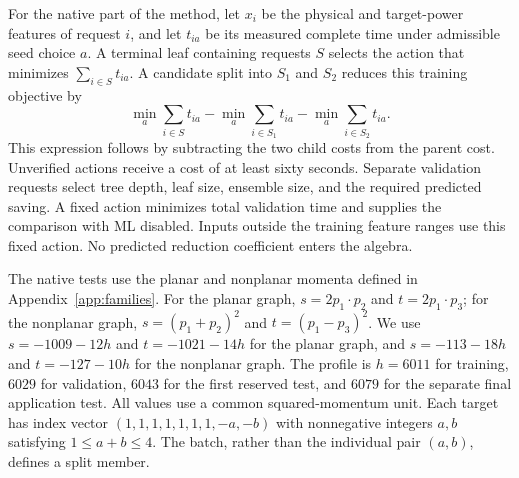 For the native part of the method, let $x_i$ be the physical and target-power features of request $i$, and let $t_{ia}$ be its measured complete time under admissible seed choice $a$. A terminal leaf containing requests $S$ selects the action that minimizes $\sum_{i\in S}t_{ia}$. A candidate split into $S_1$ and $S_2$ reduces this training objective by
\begin{equation}
 \min_a\sum_{i\in S}t_{ia}
 -\min_a\sum_{i\in S_1}t_{ia}
 -\min_a\sum_{i\in S_2}t_{ia}.
 \label{eq:notes-vac-ml-loss}
\end{equation}
This expression follows by subtracting the two child costs from the parent cost. Unverified actions receive a cost of at least sixty seconds. Separate validation requests select tree depth, leaf size, ensemble size, and the required predicted saving. A fixed action minimizes total validation time and supplies the comparison with ML disabled. Inputs outside the training feature ranges use this fixed action. No predicted reduction coefficient enters the algebra.

The native tests use the planar and nonplanar momenta defined in Appendix~\ref{app:families}. For the planar graph, $s=2p_1\cdot p_2$ and $t=2p_1\cdot p_3$; for the nonplanar graph, $s=(p_1+p_2)^2$ and $t=(p_1-p_3)^2$. We use $s=-1009-12h$ and $t=-1021-14h$ for the planar graph, and $s=-113-18h$ and $t=-127-10h$ for the nonplanar graph. The profile is $h=6011$ for training, $6029$ for validation, $6043$ for the first reserved test, and $6079$ for the separate final application test. All values use a common squared-momentum unit. Each target has index vector $(1,1,1,1,1,1,1,-a,-b)$ with nonnegative integers $a,b$ satisfying $1\leq a+b\leq4$. The batch, rather than the individual pair $(a,b)$, defines a split member.
